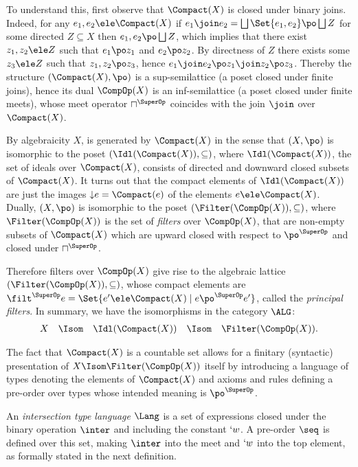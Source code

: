 \documentclass{CSML}
\begin{document}
To understand this, first observe that $\Compact(X)$ is closed under binary joins. 
Indeed, for any $e_1,e_2 \ele \Compact(X)$ if $e_1 \join e_2 = \bigsqcup \Set{e_1, e_2} \po \bigsqcup Z$ for some directed $Z\subseteq X$ then $e_1,e_2 \po \bigsqcup Z$, which implies that there exist $z_1,z_2\ele Z$ such that $e_1 \po z_1$ and $e_2 \po z_2$. 
By directness of $Z$ there exists some $z_3 \ele Z$ such that $z_1,z_2 \po z_3$, hence
$e_1 \join e_2 \po z_1 \join z_2 \po z_3$. 
Thereby the structure $(\Compact(X), \po)$ is a sup-semilattice (a poset closed under finite joins), hence its dual $\CompOp(X)$ is an inf-semilattice (a poset closed under finite meets), whose meet operator $\sqcap^{\SuperOp}$ coincides with the join $\join$ over $\Compact(X)$.

By algebraicity $X$, is generated by $\Compact(X)$ in the sense that $(X,\po)$ is isomorphic to the poset $(\Idl(\Compact(X)),\subseteq)$, where
$\Idl(\Compact(X))$, the set of ideals over $\Compact(X)$, consists of directed and downward closed subsets of $\Compact(X)$. It turns out that the compact elements of $\Idl(\Compact(X))$ 
are just the images ${\downarrow} e = \Compact(e)$ of the elements $e \ele \Compact(X)$. 
Dually, $(X,\po)$ is isomorphic to the poset $(\Filter(\CompOp(X)),\subseteq)$, where $\Filter(\CompOp(X))$ is the set of \emph{filters} over $\CompOp(X)$, that are non-empty subsets of $\Compact(X)$ which are upward closed with respect to $\po^{\SuperOp}$ and closed under $\sqcap^{\SuperOp}$. 

Therefore filters over $\CompOp(X)$ give rise to the algebraic lattice $(\Filter(\CompOp(X)),\subseteq)$, whose
compact elements are $\filt^{\SuperOp} e = \Set{e' \ele \Compact(X) \mid e\po^{\SuperOp} e'}$, called the \emph{principal filters}. 
In summary, we have the isomorphisms in the category $\ALG$:
%
 \[ \begin{array}{rcccl}
X &\Isom& \Idl(\Compact(X)) &\Isom& \Filter(\CompOp(X)) .
 \end{array} \]

The fact that $\Compact(X)$ is a countable set allows for a finitary (syntactic) presentation
of $X\Isom \Filter(\CompOp(X))$ itself by introducing a language of types denoting the elements of $\Compact(X)$ and axioms and rules defining a pre-order over types whose intended meaning is $\po^{\SuperOp}$.

An \emph{intersection type language} $\Lang$ is a set of expressions closed under the binary operation $\inter$ and including the constant $`w$. 
A pre-order $\seq$ is defined over this set, making $\inter$ into the meet and $`w$ into the top element, as formally stated in the next definition.
\end{document}
